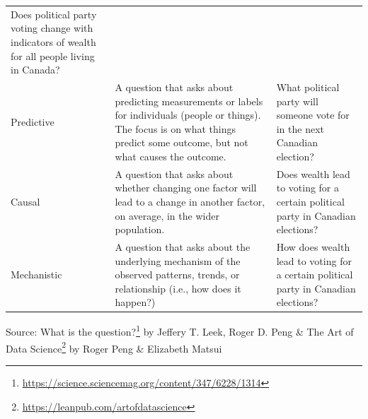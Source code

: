 \documentclass[
]{krantz}
\renewcommand{\href}[2]{#2\footnote{\url{#1}}}
\begin{document}
\begin{longtable}[]{@{}lll@{}}
\begin{minipage}[t]{0.22\columnwidth}
Does political party voting change with indicators of wealth for all people living in Canada?\strut
\end{minipage}\tabularnewline
\begin{minipage}[t]{0.37\columnwidth}\raggedright
Predictive\strut
\end{minipage} & \begin{minipage}[t]{0.32\columnwidth}\raggedright
A question that asks about predicting measurements or labels for individuals (people or things). The focus is on what things predict some outcome, but not what causes the outcome.\strut
\end{minipage} & \begin{minipage}[t]{0.22\columnwidth}\raggedright
What political party will someone vote for in the next Canadian election?\strut
\end{minipage}\tabularnewline
\begin{minipage}[t]{0.37\columnwidth}\raggedright
Causal\strut
\end{minipage} & \begin{minipage}[t]{0.32\columnwidth}\raggedright
A question that asks about whether changing one factor will lead to a change in another factor, on average, in the wider population.\strut
\end{minipage} & \begin{minipage}[t]{0.22\columnwidth}\raggedright
Does wealth lead to voting for a certain political party in Canadian elections?\strut
\end{minipage}\tabularnewline
\begin{minipage}[t]{0.37\columnwidth}\raggedright
Mechanistic\strut
\end{minipage} & \begin{minipage}[t]{0.32\columnwidth}\raggedright
A question that asks about the underlying mechanism of the observed patterns, trends, or relationship (i.e., how does it happen?)\strut
\end{minipage} & \begin{minipage}[t]{0.22\columnwidth}\raggedright
How does wealth lead to voting for a certain political party in Canadian elections?\strut
\end{minipage}\tabularnewline
\bottomrule
\end{longtable}

Source: \href{https://science.sciencemag.org/content/347/6228/1314}{What is the question?} by Jeffery T. Leek, Roger D. Peng \& \href{https://leanpub.com/artofdatascience}{The Art of Data Science} by Roger Peng \& Elizabeth Matsui
\end{document}
